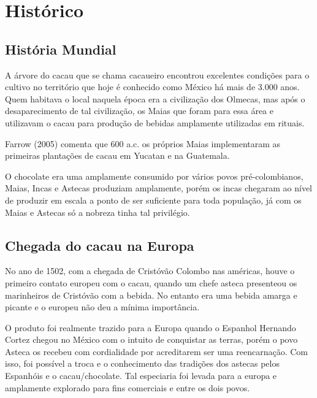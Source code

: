 \documentclass[
	12pt,				%
	openright,			%
	oneside,			%
	a4paper,			%
	english,			%
	french,				%
	spanish,			%
	brazil				%
	]{abntex2}
\begin{document}

\section{Histórico}

\subsection{História Mundial}

A árvore do cacau que se chama cacaueiro encontrou excelentes condições para o cultivo no território que hoje é conhecido como México há mais de 3.000 anos. Quem habitava o local naquela época era a civilização dos Olmecas, mas após o desaparecimento de tal civilização, os Maias que foram para essa área e utilizavam o cacau para produção de bebidas amplamente utilizadas em rituais. \cite{7}

Farrow (2005) comenta que 600 a.c. os próprios Maias implementaram as primeiras plantações de cacau em Yucatan e na Guatemala. \cite{7}

O chocolate era uma amplamente consumido por vários povos pré-colombianos, Maias, Incas e Astecas produziam amplamente, porém os incas chegaram ao nível de produzir em escala a ponto de ser suficiente para toda população, já com os Maias e Astecas só a nobreza tinha tal privilégio. 

\subsection{Chegada do cacau na Europa}

No ano de 1502, com a chegada de Cristóvão Colombo nas américas, houve o primeiro contato europeu com o cacau, quando um chefe asteca presenteou os marinheiros de Cristóvão com a bebida. No entanto era uma bebida amarga e picante e o europeu não deu a mínima importância. \cite{7}

O produto foi realmente trazido para a Europa quando o Espanhol Hernando Cortez chegou no México com o intuito de conquistar as terras, porém o povo Asteca os recebeu com cordialidade por acreditarem ser uma reencarnação. Com isso, foi possível a troca e o conhecimento das tradições dos astecas pelos Espanhóis e o cacau/chocolate. Tal especiaria foi levada para a europa e amplamente explorado para fins comerciais e entre os dois povos. \cite{7}
\end{document}
